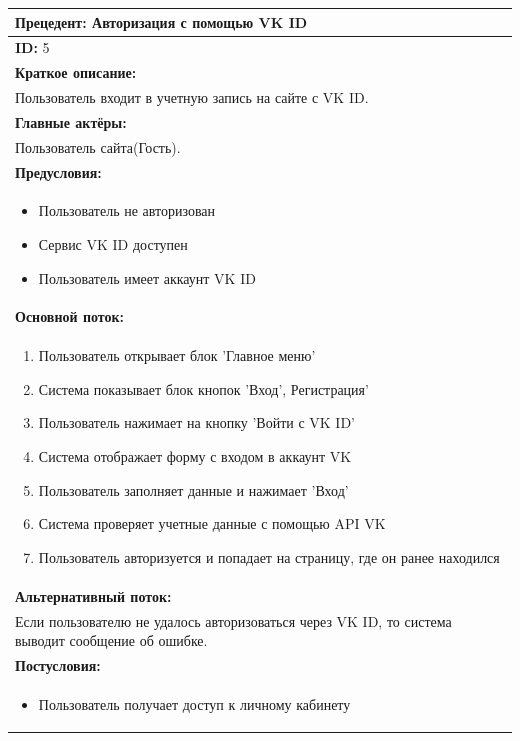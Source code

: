 \documentclass{scrreprt}
\begin{document}
\vspace{10px}
\noindent
\begin{tabularx}{\textwidth}{|X|}
	\hline
	\textbf{Прецедент: Авторизация с помощью VK ID} \\
	\hline
	\textbf{ID:} 5 \\
	\hline
	\textbf{Краткое описание:} \\
	Пользователь входит в учетную запись на сайте с VK ID. \\
	\hline
	\textbf{Главные актёры:} \\
	Пользователь сайта(Гость). \\
	\hline
	\textbf{Предусловия:} \\
	\begin{itemize}[nosep,leftmargin=*]
		\item Пользователь не авторизован
		\item Сервис VK ID доступен
		\item Пользователь имеет аккаунт VK ID
	\end{itemize} \\
	\hline
	\textbf{Основной поток:} \\
	\begin{enumerate}[nosep,leftmargin=*]
		\item Пользователь открывает блок 'Главное меню'
		\item Система показывает блок кнопок 'Вход', Регистрация'
		\item Пользователь нажимает на кнопку 'Войти с VK ID'
		\item Система отображает форму с входом в аккаунт VK
		\item Пользователь заполняет данные и нажимает 'Вход'
		\item Система проверяет учетные данные с помощью API VK
		\item Пользователь авторизуется и попадает на страницу, где он ранее находился
	\end{enumerate} \\
	\hline
	\textbf{Альтернативный поток:} \\
	Если пользователю не удалось авторизоваться через VK ID, то система выводит сообщение об ошибке.\\
	\hline
	\textbf{Постусловия:} \\
	\begin{itemize}[nosep,leftmargin=*]
		\item Пользователь получает доступ к личному кабинету
	\end{itemize} \\
	\hline
\end{tabularx}
\end{document}
